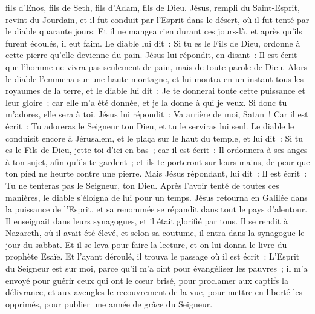 \begin{multicols}{2}
fils d'Enos, fils de Seth, fils d'Adam, fils de Dieu.
\VerseOne{}Jésus, rempli du Saint-Esprit, revint du Jourdain, et il fut conduit par l'Esprit dans le désert,
où il fut tenté par le diable quarante jours. Et il ne mangea rien durant ces jours-là, et après qu'ils furent écoulés, il eut faim.
Le diable lui dit~: Si tu es le Fils de Dieu, ordonne à cette pierre qu'elle devienne du pain.
Jésus lui répondit, en disant~: Il est écrit que l'homme ne vivra pas seulement de pain, mais de toute parole de Dieu.
Alors le diable l'emmena sur une haute montagne, et lui montra en un instant tous les royaumes de la terre,
et le diable lui dit~: Je te donnerai toute cette puissance et leur gloire~; car elle m'a été donnée, et je la donne à qui je veux.
Si donc tu m'adores, elle sera à toi.
Jésus lui répondit~: Va arrière de moi, Satan~! Car il est écrit~: Tu adoreras le Seigneur ton Dieu, et tu le serviras lui seul.
Le diable le conduisit encore à Jérusalem, et le plaça sur le haut du temple, et lui dit~: Si tu es le Fils de Dieu, jette-toi d'ici en bas~;
car il est écrit~: Il ordonnera à ses anges à ton sujet, afin qu'ils te gardent~;
et ils te porteront sur leurs mains, de peur que ton pied ne heurte contre une pierre.
Mais Jésus répondant, lui dit~: Il est écrit~: Tu ne tenteras pas le Seigneur, ton Dieu.
Après l'avoir tenté de toutes ces manières, le diable s'éloigna de lui pour un temps.
Jésus retourna en Galilée dans la puissance de l'Esprit, et sa renommée se répandit dans tout le pays d'alentour.
Il enseignait dans leurs synagogues, et il était glorifié par tous.
Il se rendit à Nazareth, où il avait été élevé, et selon sa coutume, il entra dans la synagogue le jour du sabbat. Et il se leva pour faire la lecture,
et on lui donna le livre du prophète Esaïe. Et l'ayant déroulé, il trouva le passage où il est écrit~:
L'Esprit du Seigneur est sur moi, parce qu'il m'a oint pour évangéliser les pauvres~; il m'a envoyé pour guérir ceux qui ont le cœur brisé,
pour proclamer aux captifs la délivrance, et aux aveugles le recouvrement de la vue, pour mettre en liberté les opprimés, pour publier une année de grâce du Seigneur.

\end{multicols}
